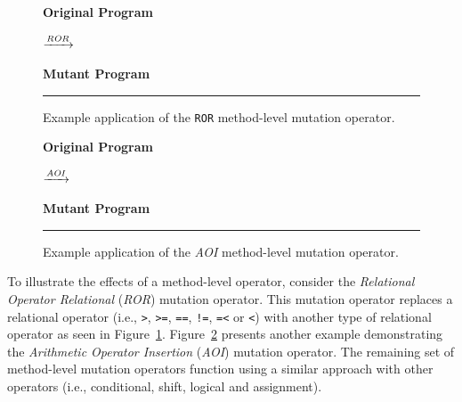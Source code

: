 \begin{figure}[!tb]
  \centering
  \begin{minipage}{6.5cm}
  \centering
  \footnotesize{\textbf{Original Program}}
  
  \end{minipage}
  $\xrightarrow{\emph{ROR}}$
  \begin{minipage}{6.5cm}
  \centering
  \footnotesize{\textbf{Mutant Program}}
  
  \end{minipage}
  \caption{Example application of the \texttt{ROR} method-level mutation operator.}
  \vspace{2mm}
  \hrule
  \label{fig:ROR_mutation}
\end{figure}

\begin{figure}[!tb]
  \centering
  \begin{minipage}{6.5cm}
  \centering
  \footnotesize{\textbf{Original Program}}
  
  \end{minipage}
  $\xrightarrow{\emph{AOI}}$
  \begin{minipage}{6.5cm}
  \centering
  \footnotesize{\textbf{Mutant Program}}
  
  \end{minipage}
  \caption{Example application of the \emph{AOI} method-level mutation operator.}
  \vspace{2mm}
  \hrule
  \label{fig:AOI_mutation}
\end{figure}

To illustrate the effects of a method-level operator, consider the \emph{Relational Operator Relational} (\emph{ROR}) mutation operator. This mutation operator replaces a relational operator (i.e., \texttt{>}, \texttt{>=}, \texttt{==}, \texttt{!=}, \texttt{=<} or \texttt{<}) with another type of relational operator as seen in Figure~\ref{fig:ROR_mutation}. Figure~\ref{fig:AOI_mutation} presents another example demonstrating the \emph{Arithmetic Operator Insertion} (\emph{AOI}) mutation operator. The remaining set of method-level mutation operators function using a similar approach with other operators (i.e., conditional, shift, logical and assignment).

